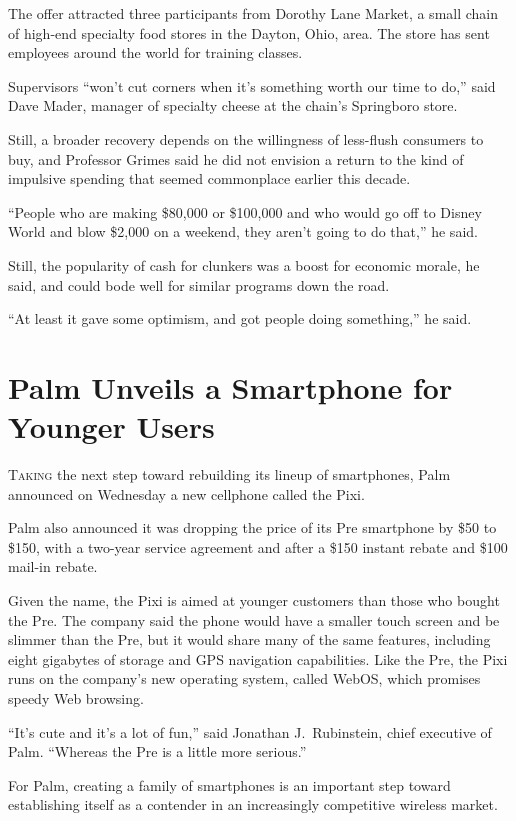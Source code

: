 ﻿\documentclass[12pt]{article}
\begin{document}
The offer attracted three participants from Dorothy Lane Market, a small chain of high-end specialty
food stores in the Dayton, Ohio, area. The store has sent employees around the world for training
classes.

Supervisors ``won't cut corners when it's something worth our time to do,'' said Dave Mader, manager
of specialty cheese at the chain's Springboro store.

Still, a broader recovery depends on the willingness of less-flush consumers to buy, and Professor
Grimes said he did not envision a return to the kind of impulsive spending that seemed commonplace
earlier this decade.

``People who are making \$80,000 or \$100,000 and who would go off to Disney World and blow \$2,000
on a weekend, they aren't going to do that,'' he said.

Still, the popularity of cash for clunkers was a boost for economic morale\cite{morale}, he said,
and could bode well for similar programs down the road.

``At least it gave some optimism, and got people doing something,'' he said.

\section{Palm Unveils a Smartphone for Younger Users}

\lettrine{T}{aking} the next step toward rebuilding its lineup of smartphones, Palm announced on
Wednesday a new cellphone called the Pixi.

Palm also announced it was dropping the price of its Pre smartphone by \$50 to \$150, with a
two-year service agreement and after a \$150 instant rebate and \$100 mail-in rebate.

Given the name, the Pixi is aimed at younger customers than those who bought the Pre. The company
said the phone would have a smaller touch screen and be slimmer than the Pre, but it would share
many of the same features, including eight gigabytes of storage and GPS navigation capabilities.
Like the Pre, the Pixi runs on the company's new operating system, called WebOS, which promises
speedy Web browsing.

``It's cute and it's a lot of fun,'' said Jonathan J.~Rubinstein, chief executive of Palm. ``Whereas
the Pre is a little more serious.''

For Palm, creating a family of smartphones is an important step toward establishing itself as a
contender in an increasingly competitive wireless market.
\end{document}
